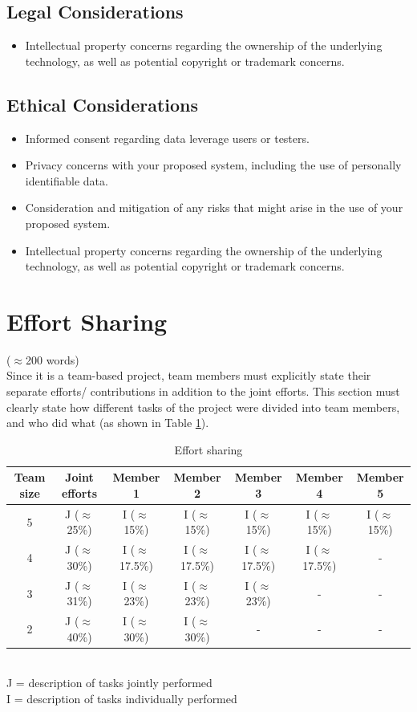 \documentclass[12pt]{article}
\begin{document}
\subsection{Legal Considerations}\label{sec:legal}
\begin{itemize}
\item Intellectual property concerns regarding the ownership of the underlying technology, as well as potential copyright or trademark concerns.
\end{itemize}

\subsection{Ethical Considerations}\label{sec:ethical}
\begin{itemize}
\item Informed consent regarding data leverage users or testers.
\item Privacy concerns with your proposed system, including the use of personally identifiable
data.
\item Consideration and mitigation of any risks that might arise in the use of your proposed
system.
\item Intellectual property concerns regarding the ownership of the underlying technology,
as well as potential copyright or trademark concerns.
\end{itemize}


\section{Effort Sharing}\label{chap:conclusion}
($\approx$200 words)\\
Since it is a team-based project, team members must explicitly state their separate efforts/ contributions in addition to the joint efforts. This section must clearly state how different tasks of the project were divided into  team members, and who did what (as shown in Table \ref{tab:effortsharing}). 
\begin{table}[h]
\begin{center}
\caption{Effort sharing}\label{tab:effortsharing}
\begin{tabular}{|c|c|c|c|c|c|c|}
\hline
Team size & Joint efforts & Member 1 & Member 2 & Member 3 & Member 4 & Member 5\\
\hline
5 & J ($\approx$25\%) & I ($\approx$15\%) & I ($\approx$15\%) & I ($\approx$15\%) & I ($\approx$15\%) & I ($\approx$15\%)\\
4 & J ($\approx$30\%) & I ($\approx$17.5\%) & I ($\approx$17.5\%) & I ($\approx$17.5\%) & I ($\approx$17.5\%) & -\\
3 & J ($\approx$31\%) & I ($\approx$23\%) & I ($\approx$23\%) & I ($\approx$23\%) & - & -\\
2 & J ($\approx$40\%) & I ($\approx$30\%) & I ($\approx$30\%) & - & - & -\\
\hline
\end{tabular}\\
J = description of tasks jointly performed\\
I = description of tasks individually performed
\end{center}
\end{table}
\end{document}
